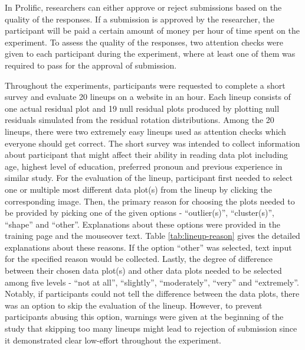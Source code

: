 \documentclass{monashthesis}
\theoremstyle{definition}
\theoremstyle{definition}
\theoremstyle{definition}
\theoremstyle{definition}
\theoremstyle{remark}
\begin{document}
In Prolific, researchers can either approve or reject submissions based on the quality of the responses. If a submission is approved by the researcher, the participant will be paid a certain amount of money per hour of time spent on the experiment. To assess the quality of the responses, two attention checks were given to each participant during the experiment, where at least one of them was required to pass for the approval of submission.

Throughout the experiments, participants were requested to complete a short survey and evaluate 20 lineups on a website in an hour. Each lineup consists of one actual residual plot and 19 null residual plots produced by plotting null residuals simulated from the residual rotation distributions. Among the 20 lineups, there were two extremely easy lineups used as attention checks which everyone should get correct. The short survey was intended to collect information about participant that might affect their ability in reading data plot including age, highest level of education, preferred pronoun and previous experience in similar study. For the evaluation of the lineup, participant first needed to select one or multiple most different data plot(s) from the lineup by clicking the corresponding image. Then, the primary reason for choosing the plots needed to be provided by picking one of the given options - ``outlier(s)'', ``cluster(s)'', ``shape'' and ``other''. Explanations about these options were provided in the training page and the mouseover text. Table \ref{tab:lineup-reason} gives the detailed explanations about these reasons. If the option ``other'' was selected, text input for the specified reason would be collected. Lastly, the degree of difference between their chosen data plot(s) and other data plots needed to be selected among five levels - ``not at all'', ``slightly'', ``moderately'', ``very'' and ``extremely''. Notably, if participants could not tell the difference between the data plots, there was an option to skip the evaluation of the lineup. However, to prevent participants abusing this option, warnings were given at the beginning of the study that skipping too many lineups might lead to rejection of submission since it demonstrated clear low-effort throughout the experiment.
\end{document}
